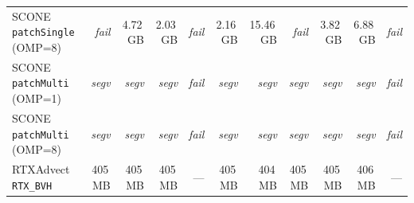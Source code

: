 \begin{table}[t]
\begin{tabular}{lrrrrrrrrrr}
SCONE \texttt{patchSingle} (OMP=8) & \textit{fail} & 4.72\,GB & 2.03\,GB & \textit{fail} & 2.16\,GB & 15.46\,GB & \textit{fail} & 3.82\,GB & 6.88\,GB & \textit{fail} \\
SCONE \texttt{patchMulti} (OMP=1) & \textit{segv} & \textit{segv} & \textit{segv} & \textit{fail} & \textit{segv} & \textit{segv} & \textit{segv} & \textit{segv} & \textit{segv} & \textit{fail} \\
SCONE \texttt{patchMulti} (OMP=8) & \textit{segv} & \textit{segv} & \textit{segv} & \textit{fail} & \textit{segv} & \textit{segv} & \textit{segv} & \textit{segv} & \textit{segv} & \textit{fail} \\
\midrule
RTXAdvect \texttt{RTX\_BVH} & 405\,MB & 405\,MB & 405\,MB & — & 405\,MB & 404\,MB & 405\,MB & 405\,MB & 406\,MB & — \\
\bottomrule
\end{tabular}
\end{table}
